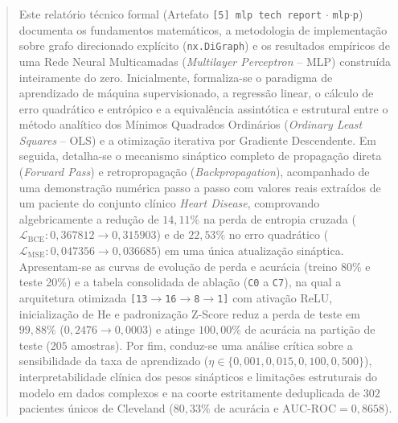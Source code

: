 ﻿\documentclass[runningheads]{llncs}
\begin{document}
\begin{abstract}
Este relat\'{o}rio t\'{e}cnico formal (Artefato \texttt{[5] mlp tech report} $\cdot$ \texttt{mlp$\cdot$p}) documenta os fundamentos matem\'{a}ticos, a metodologia de implementa\c{c}\~{a}o sobre grafo direcionado explícito (\texttt{nx.DiGraph}) e os resultados emp\'{i}ricos de uma Rede Neural Multicamadas (\textit{Multilayer Perceptron} -- MLP) constru\'{i}da inteiramente do zero. Inicialmente, formaliza-se o paradigma de aprendizado de m\'{a}quina supervisionado, a regress\~{a}o linear, o c\'{a}lculo de erro quadr\'{a}tico e entr\'{o}pico e a equival\^{e}ncia assint\'{o}tica e estrutural entre o m\'{e}todo anal\'{i}tico dos M\'{i}nimos Quadrados Ordin\'{a}rios (\textit{Ordinary Least Squares} -- OLS) e a otimiza\c{c}\~{a}o iterativa por Gradiente Descendente. Em seguida, detalha-se o mecanismo sin\'{a}ptico completo de propaga\c{c}\~{a}o direta (\textit{Forward Pass}) e retropropaga\c{c}\~{a}o (\textit{Backpropagation}), acompanhado de uma demonstra\c{c}\~{a}o num\'{e}rica passo a passo com valores reais extra\'{i}dos de um paciente do conjunto cl\'{i}nico \textit{Heart Disease}, comprovando algebricamente a redu\c{c}\~{a}o de $14{,}11\%$ na perda de entropia cruzada ($\mathcal{L}_{\text{BCE}}: 0{,}367812 \to 0{,}315903$) e de $22{,}53\%$ no erro quadr\'{a}tico ($\mathcal{L}_{\text{MSE}}: 0{,}047356 \to 0{,}036685$) em uma \'{u}nica atualiza\c{c}\~{a}o sin\'{a}ptica. Apresentam-se as curvas de evolu\c{c}\~{a}o de perda e acur\'{a}cia (treino 80\% e teste 20\%) e a tabela consolidada de abla\c{c}\~{a}o (\texttt{C0} a \texttt{C7}), na qual a arquitetura otimizada \texttt{[13$\to$16$\to$8$\to$1]} com ativa\c{c}\~{a}o ReLU, inicializa\c{c}\~{a}o de He e padroniza\c{c}\~{a}o Z-Score reduz a perda de teste em $99{,}88\%$ ($0{,}2476 \to 0{,}0003$) e atinge $100{,}00\%$ de acur\'{a}cia na parti\c{c}\~{a}o de teste ($205$ amostras). Por fim, conduz-se uma an\'{a}lise cr\'{i}tica sobre a sensibilidade da taxa de aprendizado ($\eta \in \{0{,}001, 0{,}015, 0{,}100, 0{,}500\}$), interpretabilidade cl\'{i}nica dos pesos sin\'{a}pticos e limita\c{c}\~{o}es estruturais do modelo em dados complexos e na coorte estritamente deduplicada de $302$ pacientes \'{u}nicos de Cleveland ($80{,}33\%$ de acur\'{a}cia e $\text{AUC-ROC} = 0{,}8658$).

\end{abstract}
\end{document}

